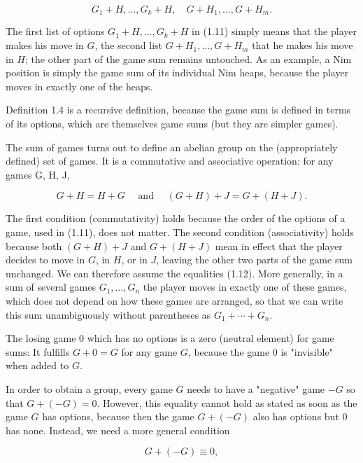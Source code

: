 \documentclass[12pt]{article}
\begin{document}
\begin{equation*}
G_{1}+H, \ldots, G_{k}+H, \quad G+H_{1}, \ldots, G+H_{m} . \tag{1.11}
\end{equation*}


The first list of options $G_{1}+H, \ldots, G_{k}+H$ in (1.11) simply means that the player makes his move in $G$, the second list $G+H_{1}, \ldots, G+H_{m}$ that he makes his move in $H$; the other part of the game sum remains untouched. As an example, a Nim position is simply the game sum of its individual Nim heaps, because the player moves in exactly one of the heaps.

Definition 1.4 is a recursive definition, because the game sum is defined in terms of its options, which are themselves game sums (but they are simpler games).

The sum of games turns out to define an abelian group on the (appropriately defined) set of games. It is a commutative and associative operation: for any games G, H, J,


\begin{equation*}
G+H=H+G \quad \text { and } \quad(G+H)+J=G+(H+J) . \tag{1.12}
\end{equation*}


The first condition (commutativity) holds because the order of the options of a game, used in (1.11), does not matter. The second condition (associativity) holds\\
because both $(G+H)+J$ and $G+(H+J)$ mean in effect that the player decides to move in $G$, in $H$, or in $J$, leaving the other two parts of the game sum unchanged. We can therefore assume the equalities (1.12). More generally, in a sum of several games $G_{1}, \ldots, G_{n}$ the player moves in exactly one of these games, which does not depend on how these games are arranged, so that we can write this sum unambiguously without parentheses as $G_{1}+\cdots+G_{n}$.

The losing game 0 which has no options is a zero (neutral element) for game sums: It fulfills $G+0=G$ for any game $G$, because the game 0 is "invisible" when added to $G$.

In order to obtain a group, every game $G$ needs to have a "negative" game $-G$ so that $G+(-G)=0$. However, this equality cannot hold as stated as soon as the game $G$ has options, because then the game $G+(-G)$ also has options but 0 has none. Instead, we need a more general condition


\begin{equation*}
G+(-G) \equiv 0, \tag{1.13}
\end{equation*}
\end{document}
